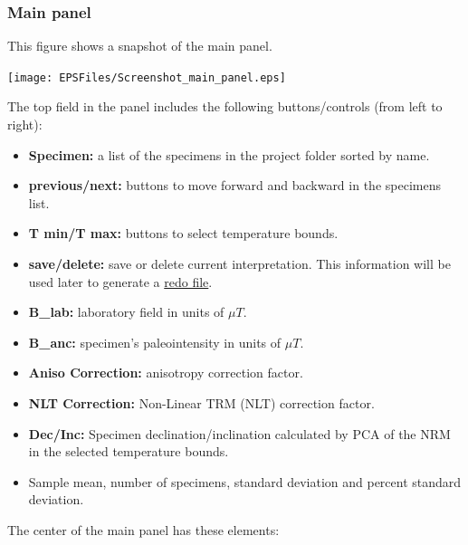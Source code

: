 \documentclass[11pt]{book}
\begin{document}
{\subsubsection{Main panel}

This figure shows a snapshot of the main panel.

  \texttt{[image: EPSFiles/Screenshot\_main\_panel.eps]}

\noindent
  The top field in the  panel includes the following buttons/controls (from left to right):
  \begin{itemize}
\item {\bf Specimen:} a list of the specimens in the project folder sorted by name.
\item {\bf previous/next:} buttons to move forward and backward in the specimens list.
\item {\bf T min/T max:} buttons to select temperature bounds.
\item {\bf save/delete:} save or delete current interpretation. This information will be used later to generate a \href{#mk_redo.py}{redo file}.
\item {\bf B\_lab:} laboratory field in units of $\mu T$.
\item {\bf B\_anc:} specimen's paleointensity in units of $\mu T$.
\item {\bf Aniso Correction:} anisotropy correction factor.
\item {\bf NLT Correction:} Non-Linear TRM (NLT) correction factor.
\item {\bf Dec/Inc:} Specimen declination/inclination calculated by PCA of the NRM in the selected temperature bounds.
\item Sample mean, number of specimens, standard deviation and percent standard deviation.
\end{itemize}

The center of the main panel has these elements:

}
\end{document}
